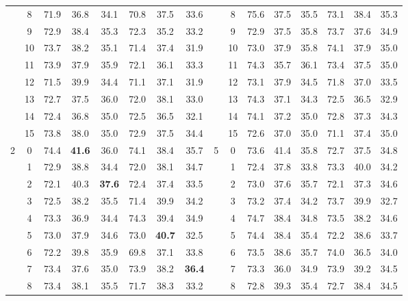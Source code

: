 \begin{table}[p]
{\begin{tabular}{c c | c c c | c c c || c c | c c c | c c c}
             & 8 & 71.9 & 36.8 & 34.1 & 70.8 & 37.5 & 33.6 &  & 8 & 75.6 & 37.5 & 35.5 & 73.1 & 38.4 & 35.3 \\
             & 9 & 72.9 & 38.4 & 35.3 & 72.3 & 35.2 & 33.2 &  & 9 & 72.9 & 37.5 & 35.8 & 73.7 & 37.6 & 34.9 \\
             & 10 & 73.7 & 38.2 & 35.1 & 71.4 & 37.4 & 31.9 &  & 10 & 73.0 & 37.9 & 35.8 & 74.1 & 37.9 & 35.0 \\
             & 11 & 73.9 & 37.9 & 35.9 & 72.1 & 36.1 & 33.3 &  & 11 & 74.3 & 35.7 & 36.1 & 73.4 & 37.5 & 35.0 \\
             & 12 & 71.5 & 39.9 & 34.4 & 71.1 & 37.1 & 31.9 &  & 12 & 73.1 & 37.9 & 34.5 & 71.8 & 37.0 & 33.5 \\
             & 13 & 72.7 & 37.5 & 36.0 & 72.0 & 38.1 & 33.0 &  & 13 & 74.3 & 37.1 & 34.3 & 72.5 & 36.5 & 32.9 \\
             & 14 & 72.4 & 36.8 & 35.0 & 72.5 & 36.5 & 32.1 &  & 14 & 74.1 & 37.2 & 35.0 & 72.8 & 37.3 & 34.3 \\
             & 15 & 73.8 & 38.0 & 35.0 & 72.9 & 37.5 & 34.4 &  & 15 & 72.6 & 37.0 & 35.0 & 71.1 & 37.4 & 35.0 \\
            \midrule
            \multirow{16}{*}{2} & 0 & 74.4 & \textbf{41.6} & 36.0 & 74.1 & 38.4 & 35.7 & \multirow{16}{*}{5} & 0 & 73.6 & 41.4 & 35.8 & 72.7 & 37.5 & 34.8 \\
             & 1 & 72.9 & 38.8 & 34.4 & 72.0 & 38.1 & 34.7 &  & 1 & 72.4 & 37.8 & 33.8 & 73.3 & 40.0 & 34.2 \\
             & 2 & 72.1 & 40.3 & \textbf{37.6} & 72.4 & 37.4 & 33.5 &  & 2 & 73.0 & 37.6 & 35.7 & 72.1 & 37.3 & 34.6 \\
             & 3 & 72.5 & 38.2 & 35.5 & 71.4 & 39.9 & 34.2 &  & 3 & 73.2 & 37.4 & 34.2 & 73.7 & 39.9 & 32.7 \\
             & 4 & 73.3 & 36.9 & 34.4 & 74.3 & 39.4 & 34.9 &  & 4 & 74.7 & 38.4 & 34.8 & 73.5 & 38.2 & 34.6 \\
             & 5 & 73.0 & 37.9 & 34.6 & 73.0 & \textbf{40.7} & 32.5 &  & 5 & 74.4 & 38.4 & 35.4 & 72.2 & 38.6 & 33.7 \\
             & 6 & 72.2 & 39.8 & 35.9 & 69.8 & 37.1 & 33.8 &  & 6 & 73.5 & 38.6 & 35.7 & 74.0 & 36.5 & 34.0 \\
             & 7 & 73.4 & 37.6 & 35.0 & 73.9 & 38.2 & \textbf{36.4} &  & 7 & 73.3 & 36.0 & 34.9 & 73.9 & 39.2 & 34.5 \\
             & 8 & 73.4 & 38.1 & 35.5 & 71.7 & 38.3 & 33.2 &  & 8 & 72.8 & 39.3 & 35.4 & 72.7 & 38.4 & 34.5 \\

\end{tabular}}
\end{table}
